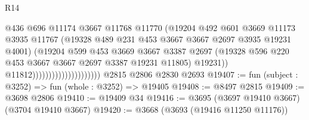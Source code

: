 \begin{lexlean}{R14}
\begin{coremodule}
                                              @436
                                              @696
                                              @11174
                                              @3667
                                              @11768
                                              @11770
                                              (@19204
                                                @492
                                                @601
                                                @3669
                                                @11173
                                                @3935
                                                @11767
                                                (@19328
                                                  @489
                                                  @231
                                                  @453
                                                  @3667
                                                  @3667
                                                  @2697
                                                  @3935
                                                  @19231
                                                  @4001)
                                                (@19204
                                                  @599
                                                  @453
                                                  @3669
                                                  @3667
                                                  @3387
                                                  @2697
                                                  (@19328
                                                    @596
                                                    @220
                                                    @453
                                                    @3667
                                                    @3667
                                                    @2697
                                                    @3387
                                                    @19231
                                                    @11805)
                                                  @19231))
                                              @11812)))))))))))))))))))))
    @2815
    @2806
    @2830
    @2693
@19407 := fun (subject : @3252) => fun (whole : @3252) => @19405
@19408 := @8497 @2815
@19409 := @3698 @2806
@19410 := @19409 @34
@19416 := @3695 (@3697 @19410 @3667) (@3704 @19410 @3667)
@19420 := @3668 (@3693 (@19416 @11250 @11176))

\end{coremodule}
\end{lexlean}
